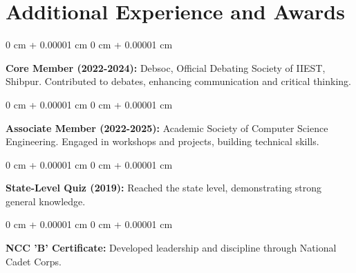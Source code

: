 \documentclass[10pt, letterpaper]{article}
\newenvironment{highlights}{
    \begin{itemize}[
        topsep=0.10 cm,
        parsep=0.10 cm,
        partopsep=0pt,
        itemsep=0pt,
        leftmargin=0 cm + 10pt
    ]
}{
    \end{itemize}
} %
\newenvironment{onecolentry}{
    \begin{adjustwidth}{
        0 cm + 0.00001 cm
    }{
        0 cm + 0.00001 cm
    }
}{
    \end{adjustwidth}
} %
\newenvironment{twocolentry}[2][]{
    \onecolentry
    \def\secondColumn{#2}
    \setcolumnwidth{\fill, 4.5 cm}
    \begin{paracol}{2}
}{
    \switchcolumn \raggedleft \secondColumn
    \end{paracol}
    \endonecolentry
} %
\begin{document}



\section{Additional Experience and Awards}

\begin{onecolentry}
    \textbf{Core Member (2022-2024):} Debsoc, Official Debating Society of IIEST, Shibpur. Contributed to debates, enhancing communication and critical thinking.
\end{onecolentry}

\begin{onecolentry}
    \textbf{Associate Member (2022-2025):} Academic Society of Computer Science Engineering. Engaged in workshops and projects, building technical skills.
\end{onecolentry}

\begin{onecolentry}
    \textbf{State-Level Quiz (2019):} Reached the state level, demonstrating strong general knowledge.
\end{onecolentry}

\begin{onecolentry}
    \textbf{NCC 'B' Certificate:} Developed leadership and discipline through National Cadet Corps.
\end{onecolentry}
\end{document}
